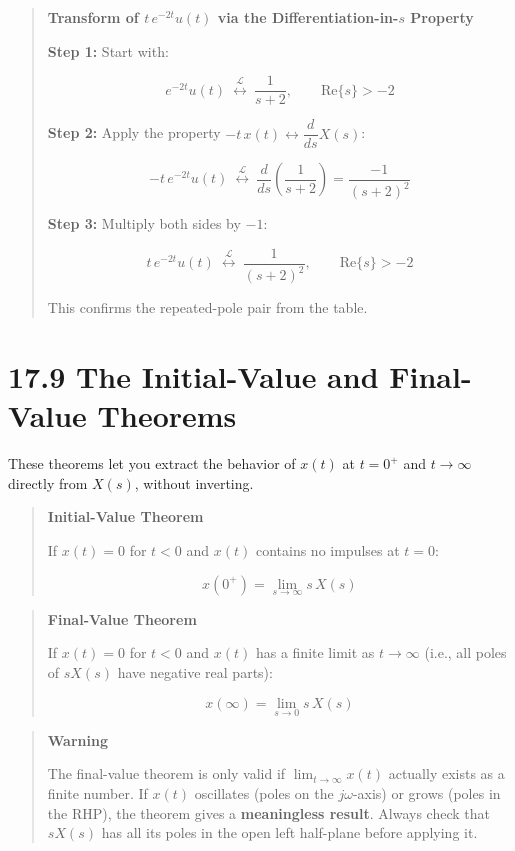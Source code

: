\documentclass[11pt]{article}
\begin{document}
\begin{quote}
\textbf{Transform of $t\, e^{-2t} u(t)$ via the Differentiation-in-$s$ Property}

\textbf{Step 1:} Start with:

\[e^{-2t} u(t)\ \overset{\mathcal{L}}{\longleftrightarrow}\ \frac{1}{s+2}, \qquad \text{Re}\{s\} > -2\]

\textbf{Step 2:} Apply the property $-t\, x(t) \leftrightarrow \dfrac{d}{ds} X(s)$:

\[-t\, e^{-2t} u(t)\ \overset{\mathcal{L}}{\longleftrightarrow}\ \frac{d}{ds}\!\left(\frac{1}{s+2}\right) = \frac{-1}{(s+2)^2}\]

\textbf{Step 3:} Multiply both sides by $-1$:

\[\boxed{t\, e^{-2t} u(t)\ \overset{\mathcal{L}}{\longleftrightarrow}\ \frac{1}{(s+2)^2}, \qquad \text{Re}\{s\} > -2}\]

This confirms the repeated-pole pair from the table.
\end{quote}

\section*{17.9 The Initial-Value and Final-Value Theorems}

These theorems let you extract the behavior of $x(t)$ at $t = 0^+$ and $t \to \infty$ directly from $X(s)$, without inverting.

\begin{quote}
\textbf{Initial-Value Theorem}

If $x(t) = 0$ for $t < 0$ and $x(t)$ contains no impulses at $t = 0$:

\[\boxed{x(0^+) = \lim_{s \to \infty} s\, X(s)}\]
\end{quote}

\begin{quote}
\textbf{Final-Value Theorem}

If $x(t) = 0$ for $t < 0$ and $x(t)$ has a finite limit as $t \to \infty$ (i.e., all poles of $s X(s)$ have negative real parts):

\[\boxed{x(\infty) = \lim_{s \to 0} s\, X(s)}\]
\end{quote}

\begin{quote}
\textbf{Warning}

The final-value theorem is only valid if $\lim_{t \to \infty} x(t)$ actually exists as a finite number. If $x(t)$ oscillates (poles on the $j\omega$-axis) or grows (poles in the RHP), the theorem gives a \textbf{meaningless result}. Always check that $s X(s)$ has all its poles in the open left half-plane before applying it.
\end{quote}
\end{document}
